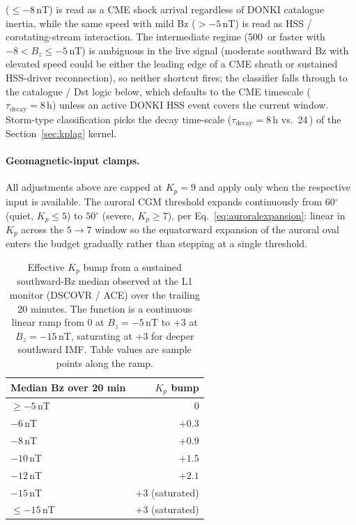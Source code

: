 \documentclass[11pt,a4paper]{article}
\newcommand{\SI}[2]{#1\,\text{#2}}
\newcommand{\degree}{\ensuremath{{}^\circ}}
\begin{document}
\begin{itemize}[nosep]
        ($\leq -8$\,nT) is read as a CME shock arrival regardless of
        DONKI catalogue inertia, while the same speed with mild Bz
        ($> -5$\,nT) is read as HSS / corotating-stream interaction.
        The intermediate regime (\SI{500}{km/s} or faster with
        $-8 < B_z \le -5$\,nT) is ambiguous in the live signal
        (moderate southward Bz with elevated speed could be either
        the leading edge of a CME sheath or sustained HSS-driver
        reconnection), so neither shortcut fires; the classifier
        falls through to the catalogue / Dst logic below, which
        defaults to the CME timescale ($\tau_{\text{decay}} =
        \SI{8}{h}$) unless an active DONKI HSS event covers the
        current window.  Storm-type classification picks the decay
        time-scale ($\tau_{\text{decay}} = \SI{8}{h}$ vs.\
        \SI{24}{h}) of the Section~\ref{sec:kplag} kernel.
\end{itemize}

\paragraph{Geomagnetic-input clamps.}  All adjustments above are
capped at $K_p = 9$ and apply only when the respective input is
available.  The auroral CGM threshold expands
continuously from $60\degree$ (quiet, $K_p \le 5$) to $50\degree$
(severe, $K_p \ge 7$), per Eq.~\ref{eq:auroralexpansion}:
linear in $K_p$ across the $5 \to 7$ window so the equatorward
expansion of the auroral oval enters the budget gradually rather
than stepping at a single threshold.

\begin{table}[H]
\centering
\caption{Effective $K_p$ bump from a sustained southward-Bz median
         observed at the L1 monitor (DSCOVR / ACE) over the trailing
         20 minutes. The function is a continuous linear ramp from
         0 at $B_z = -5$\,nT to $+3$ at $B_z = -15$\,nT, saturating
         at $+3$ for deeper southward IMF. Table values are sample
         points along the ramp.}
\label{tab:bzbump}
\begin{tabular}{@{}lr@{}}
\toprule
\textbf{Median Bz over 20 min} & \textbf{$K_p$ bump} \\
\midrule
$\geq -5$\,nT   & $0$            \\
$-6$\,nT        & $+0.3$         \\
$-8$\,nT        & $+0.9$         \\
$-10$\,nT       & $+1.5$         \\
$-12$\,nT       & $+2.1$         \\
$-15$\,nT       & $+3$ (saturated) \\
$\leq -15$\,nT  & $+3$ (saturated) \\
\bottomrule
\end{tabular}
\end{table}
\end{document}
